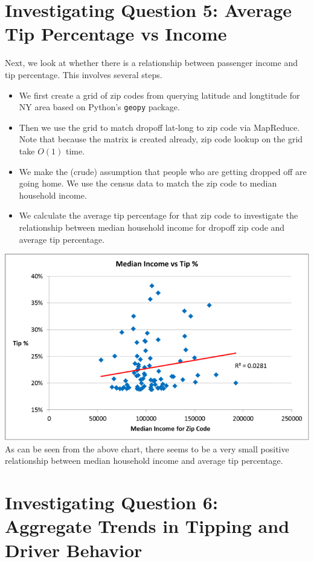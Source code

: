 \documentclass[twoside]{article}
\begin{document}
\begin{multicols}{2}
\section{Investigating Question 5: Average Tip Percentage vs Income}
Next, we look at whether there is a relationship between passenger income and tip percentage. This involves several steps.
\begin{itemize}
\item We first create a grid of zip codes from querying latitude and longtitude for NY area based on Python's \texttt{geopy} package.
\item Then we use the grid to match dropoff lat-long to zip code via MapReduce. Note that because the matrix is created already, zip code lookup on the grid take $O(1)$ time.
\item We make the (crude) assumption that people who are getting dropped off are going home. We use the census data to match the zip code to median household income.
\item We calculate the average tip percentage for that zip code to investigate the relationship between median household income for dropoff zip code and average tip percentage.
\end{itemize}

\includegraphics[scale=.35]{zip_income.png}
As can be seen from the above chart, there seems to be a very small positive relationship between median household income and average tip percentage.

\section{Investigating Question 6: Aggregate Trends in Tipping and Driver Behavior}

\end{multicols}
\end{document}
